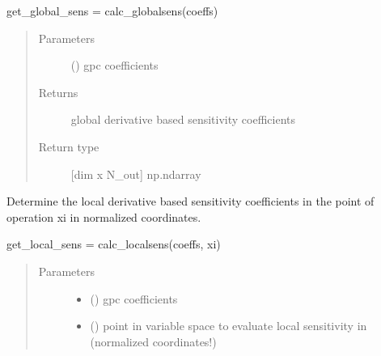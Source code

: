 \documentclass[letterpaper,10pt,english,openany,oneside]{sphinxmanual}
\begin{document}
\begin{fulllineitems}
\begin{fulllineitems}
get\_global\_sens = calc\_globalsens(coeffs)
\begin{quote}\begin{description}
\item[{Parameters}] \leavevmode
{} (\sphinxstyleliteralemphasis{\sphinxupquote{{[}}}\sphinxstyleliteralemphasis{\sphinxupquote{{]} }}) \textendash{} gpc coefficients

\item[{Returns}] \leavevmode
{} \textendash{} global derivative based sensitivity coefficients

\item[{Return type}] \leavevmode
{[}dim x N\_out{]} np.ndarray

\end{description}\end{quote}

\end{fulllineitems}


\begin{fulllineitems}
\label{\detokenize{pygpc:pygpc.gpc.gPC.get_local_sens}}
Determine the local derivative based sensitivity coefficients in the point of operation xi
in normalized coordinates.

get\_local\_sens = calc\_localsens(coeffs, xi)
\begin{quote}\begin{description}
\item[{Parameters}] \leavevmode\begin{itemize}
\item {} 
 (\sphinxstyleliteralemphasis{\sphinxupquote{{[}}}\sphinxstyleliteralemphasis{\sphinxupquote{{]} }}) \textendash{} gpc coefficients

\item {} 
 (\sphinxstyleliteralemphasis{\sphinxupquote{{[}}}\sphinxstyleliteralemphasis{\sphinxupquote{{]} }}) \textendash{} point in variable space to evaluate local sensitivity in (normalized coordinates!)


\end{itemize}
\end{description}
\end{quote}
\end{fulllineitems}
\end{fulllineitems}
\end{document}
